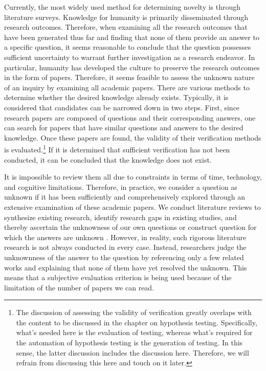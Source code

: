 Currently, the most widely used method for determining novelty is through literature surveys. Knowledge for humanity is primarily disseminated through research outcomes. Therefore, when examining all the research outcomes that have been generated thus far and finding that none of them provide an answer to a specific question, it seems reasonable to conclude that the question possesses sufficient uncertainty to warrant further investigation as a research endeavor. In particular, humanity has developed the culture to preserve the research outcomes in the form of papers. Therefore, it seems feasible to assess the unknown nature of an inquiry by examining all academic papers. There are various methods to determine whether the desired knowledge already exists. Typically, it is considered that candidates can be narrowed down in two steps. First, since research papers are composed of questions and their corresponding answers, one can search for papers that have similar questions and answers to the desired knowledge. Once these papers are found, the validity of their verification methods is evaluated.\footnote{
The discussion of assessing the validity of verification greatly overlaps with the content to be discussed in the chapter on hypothesis testing. Specifically, what's needed here is the evaluation of testing, whereas what's required for the automation of hypothesis testing is the generation of testing. In this sense, the latter discussion includes the discussion here. Therefore, we will refrain from discussing this here and touch on it later.
} If it is determined that sufficient verification has not been conducted, it can be concluded that the knowledge does not exist. 

It is impossible to review them all due to constraints in terms of time, technology, and cognitive limitations. Therefore, in practice, we consider a question as unknown if it has been sufficiently and comprehensively explored through an extensive examination of these academic papers. We conduct literature reviews to synthesize existing research, identify research gaps in existing studies, and thereby ascertain the unknowness of our own questions or construct question for which the answers are unknown \cite{schryen2015theory}. However, in reality, such rigorous literature research is not always conducted in every case. Instead, researchers judge the unknownness of the answer to the question by referencing only a few related works and explaining that none of them have yet resolved the unknown. This means that a subjective evaluation criterion is being used because of the limitation of the number of papers we can read. 

